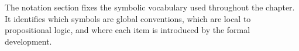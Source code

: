\begin{remark*}[Exposition]
The notation section fixes the symbolic vocabulary used throughout the chapter.
It identifies which symbols are global conventions, which are local to
propositional logic, and where each item is introduced by the formal
development.
\end{remark*}
